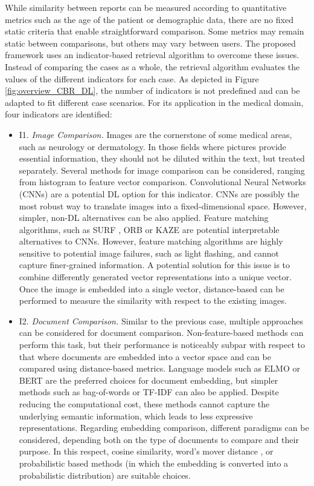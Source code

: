 While similarity between reports can be measured according to quantitative metrics such as the age of the patient or demographic data, there are no fixed static criteria that enable straightforward comparison. Some metrics may remain static between comparisons, but others may vary between users. The proposed framework uses an indicator-based retrieval algorithm to overcome these issues. Instead of comparing the cases as a whole, the retrieval algorithm evaluates the values of the different indicators for each case. As depicted in Figure \ref{fig:overview_CBR_DL}, the number of indicators is not predefined and can be adapted to fit different case scenarios. For its application in the medical domain, four indicators are identified:
\begin{itemize}
    \item I1. \textit{Image Comparison.} Images are the cornerstone of some medical areas, such as neurology or dermatology. In those fields where pictures provide essential information, they should not be diluted within the text, but treated separately. Several methods for image comparison can be considered, ranging from histogram to feature vector comparison. Convolutional Neural Networks (CNNs) are a potential DL option for this indicator. CNNs are possibly the most robust way to translate images into a fixed-dimensional space. However, simpler, non-DL alternatives can be also applied. Feature matching algorithms, such as SURF \citep{image_surf}, ORB \citep{ORB_image} or KAZE \citep{KAZE_images} are potential interpretable alternatives to CNNs. However, feature matching algorithms are highly sensitive to potential image failures, such as light flashing, and cannot capture finer-grained information. A potential solution for this issue is to combine differently generated vector representations into a unique vector. Once the image is embedded into a single vector, distance-based can be performed to measure the similarity with respect to the existing images.
    
    \item I2. \textit{Document Comparison.} Similar to the previous case, multiple approaches can be considered for document comparison. Non-feature-based methods can perform this task, but their performance is noticeably subpar with respect to that where documents are embedded into a vector space and can be compared using distance-based metrics. Language models such as ELMO \citep{elmo} or BERT \citep{bert} are the preferred choices for document embedding, but simpler methods such as bag-of-words or TF-IDF can also be applied. Despite reducing the computational cost, these methods cannot capture the underlying semantic information, which leads to less expressive representations. Regarding embedding comparison, different paradigms can be considered, depending both on the type of documents to compare and their purpose. In this respect, cosine similarity, word's mover distance \citep{word_mover_distance}, or probabilistic based methods (in which the embedding is converted into a probabilistic distribution) are suitable choices.
    

\end{itemize}
